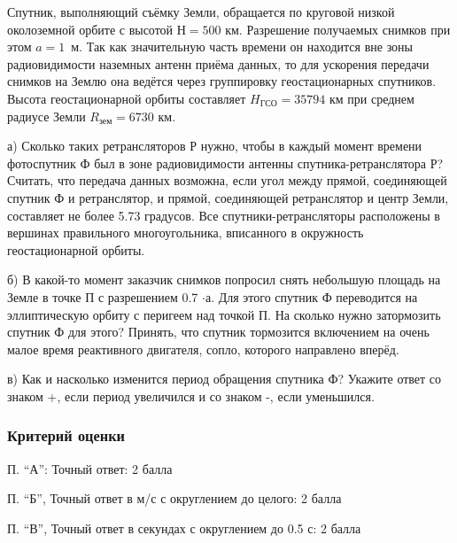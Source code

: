 
Спутник, выполняющий съёмку Земли, обращается по круговой низкой околоземной орбите с высотой $Н=500$ км. 
Разрешение получаемых снимков при этом $a=1$~м. Так как значительную часть времени он находится вне зоны 
радиовидимости наземных антенн приёма данных, то для ускорения передачи снимков на Землю она ведётся 
через группировку геостационарных спутников. Высота геостационарной орбиты составляет $H_\text{ГСО} = 35794$ 
км при среднем радиусе Земли $R_{\text{зем}} = 6730$ км. 

а) Сколько таких ретрансляторов Р нужно, чтобы в каждый момент времени фотоспутник Ф был в зоне радиовидимости антенны спутника-ретранслятора Р? Считать, что передача данных возможна, если угол между прямой, соединяющей спутник Ф и ретранслятор, и прямой, 
соединяющей ретранслятор и центр Земли, составляет не более 5.73 градусов. Все спутники-ретрансляторы 
расположены в вершинах правильного многоугольника, вписанного в окружность геостационарной орбиты.

б) В какой-то момент заказчик снимков попросил снять небольшую площадь на Земле в точке П с разрешением 0.7 $\cdot$а. 
Для этого спутник Ф переводится на эллиптическую орбиту с перигеем над точкой П. На сколько нужно затормозить спутник Ф для этого? 
Принять, что спутник тормозится включением на очень малое время реактивного двигателя, сопло, которого направлено вперёд.

в) Как и насколько изменится период обращения спутника Ф? Укажите ответ со знаком +, если период увеличился и со знаком -, если уменьшился.

\subsubsection*{Критерий оценки}

П. “А”: Точный ответ: 2 балла

П. “Б”, Точный ответ в м/с с округлением до целого: 2 балла

П. “В”, Точный ответ в секундах с округлением до 0.5 с: 2 балла

\solutionSection

